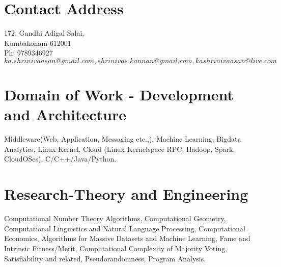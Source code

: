 \documentclass[11pt,onecolumn]{article}
\begin{document}
\section{Contact Address}
172, Gandhi Adigal Salai, \\
Kumbakonam-612001 \\
Ph: 9789346927 \\
$ka.shrinivaasan@gmail.com, shrinivas.kannan@gmail.com, kashrinivaasan@live.com$ 

\section{Domain of Work - Development and Architecture}
Middleware(Web, Application, Messaging etc.,), Machine Learning, Bigdata Analytics, Linux Kernel, Cloud (Linux Kernelspace RPC, Hadoop, Spark, CloudOSes), C/C++/Java/Python.

\section{Research-Theory and Engineering}
Computational Number Theory Algorithms, Computational Geometry, Computational Linguistics and Natural Language Processing, Computational Economics, Algorithms for Massive Datasets and Machine Learning, Fame and Intrinsic Fitness/Merit, Computational Complexity of Majority Voting, Satisfiability and related, Pseudorandomness, Program Analysis.
\end{document}
